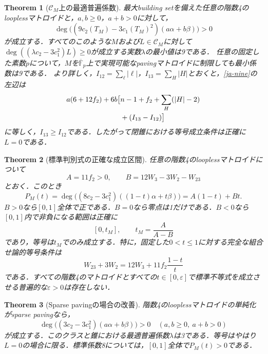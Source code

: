 \documentclass[12pt]{amsart}
\newtheorem{thm}{Theorem}[section]
\theoremstyle{definition}
\theoremstyle{remark}
\numberwithin{equation}{section}
\begin{document}
\begin{thm}[$\mathscr C_M$上の最適普遍係数]\label{ja-main}
最大building setを備えた任意の階数4のlooplessマトロイドと，$a,b\geq0$，$a+b>0$に対して，
\begin{equation}\label{ja-nine}
 \deg\bigl((9c_2(T_M)-3c_1(T_M)^2)(a\alpha+b\beta)\bigr)>0
\end{equation}
が成立する．すべてのこのような$M$および$L\in\mathscr C_M$に対して
$\deg((\lambda c_2-3c_1^2)L)\geq0$が成立する実数$\lambda$の最小値は9である．
任意の固定した素数$p$について，$M$を$\overline{\mathbb F}_p$上で実現可能なpavingマトロイドに制限しても最小係数は9である．
より詳しく，$I_{12}=\sum_\ell|\ell|$，$I_{13}=\sum_H|H|$とおくと，\eqref{ja-nine}の左辺は
\begin{align}\label{ja-certificate}
 a(6+12f_2)+6b\bigl[&n-1+f_2+\sum_H(|H|-2)\notag\\
                  &+(I_{13}-I_{12})\bigr]
\end{align}
に等しく，$I_{13}\geq I_{12}$である．したがって閉錐における等号成立条件は正確に$L=0$である．
\end{thm}

\begin{thm}[標準判別式の正確な成立区間]\label{ja-interval}
任意の階数4のlooplessマトロイドについて
\[
 A=11f_2>0,\qquad B=12W_3-3W_2-W_{23}
\]
とおく．このとき
\begin{equation}\label{ja-linear}
 P_M(t)=\deg\bigl((8c_2-3c_1^2)((1-t)\alpha+t\beta)\bigr)
       =A(1-t)+Bt.
\end{equation}
$B>0$なら$[0,1]$全体で正である．$B=0$なら零点は1だけである．$B<0$なら$[0,1]$内で非負になる範囲は正確に
\[
 [0,t_M],\qquad t_M=\frac{A}{A-B}
\]
であり，等号は$t_M$でのみ成立する．特に，固定した$0<t\leq1$に対する完全な組合せ論的等号条件は
\begin{equation}\label{ja-equality}
 W_{23}+3W_2=12W_3+11f_2\frac{1-t}{t}
\end{equation}
である．すべての階数4のマトロイドとすべての$t\in[0,\varepsilon]$で標準不等式を成立させる普遍的な$\varepsilon>0$は存在しない．
\end{thm}

\begin{thm}[Sparse pavingの場合の改善]\label{ja-sparse}
階数4のlooplessマトロイドの単純化がsparse pavingなら，
\[
 \deg\bigl((3c_2-3c_1^2)(a\alpha+b\beta)\bigr)>0
 \quad(a,b\geq0,\ a+b>0)
\]
が成立する．このクラスと錐における最適普遍係数$\lambda$は3である．等号はやはり$L=0$の場合に限る．標準係数8については，$[0,1]$全体で$P_M(t)>0$である．
\end{thm}
\end{document}
